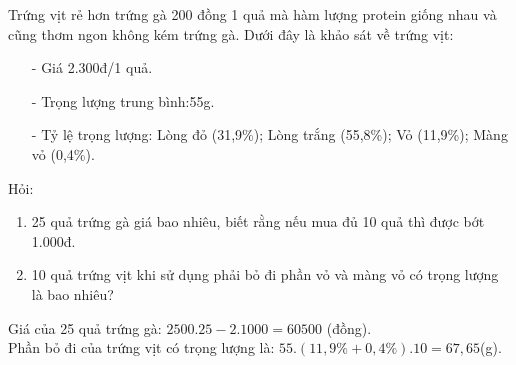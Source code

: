 \begin{ex}%
	Trứng vịt rẻ hơn trứng gà 200 đồng 1 quả mà hàm lượng protein giống nhau và cũng thơm ngon không kém trứng gà. Dưới đây là khảo sát về trứng vịt:
    \begin{itemize}
    	\item [-]Giá 2.300đ/1 quả.
    	\item [-]Trọng lượng trung bình:55g.
    	\item [-]Tỷ lệ trọng lượng: Lòng đỏ (31,9\%); Lòng trắng (55,8\%); Vỏ (11,9\%); Màng vỏ (0,4\%).
	\end{itemize}
    Hỏi:
    \begin{enumerate}
		\item 25 quả trứng gà giá bao nhiêu, biết rằng nếu mua đủ 10 quả thì được bớt 1.000đ.
		\item 10 quả trứng vịt khi sử dụng phải bỏ đi phần vỏ và màng vỏ có trọng lượng là bao nhiêu?
	\end{enumerate}
	\loigiai
	{
	Giá của 25 quả trứng gà: $2500.25-2.1000=60500$ (đồng).\\
    Phần bỏ đi của trứng vịt có trọng lượng là: $55.(11,9\% +0,4\%).10=67,65$(g).
    
}
\end{ex}
